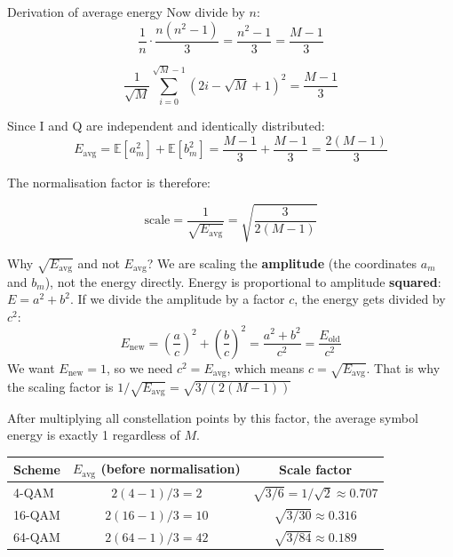 \begin{KeyBox}{Derivation of average energy}
Now divide by $n$:
\begin{equation}
\frac{1}{n} \cdot \frac{n(n^2 - 1)}{3} = \frac{n^2 - 1}{3} = \frac{M - 1}{3}
\end{equation}

\begin{equation}
\boxed{\frac{1}{\sqrt{M}}\sum_{i=0}^{\sqrt{M}-1}(2i - \sqrt{M} + 1)^2 = \frac{M-1}{3}}
\end{equation}

\vspace{0.5cm}

Since I and Q are independent and identically distributed:
\begin{equation}
E_{\text{avg}} = \mathbb{E}[a_m^2] + \mathbb{E}[b_m^2]
= \frac{M-1}{3} + \frac{M-1}{3}
= \frac{2(M-1)}{3}
\end{equation}
\end{KeyBox}

The normalisation factor is therefore:

\begin{equation}
\text{scale} = \frac{1}{\sqrt{E_{\text{avg}}}} = \sqrt{\frac{3}{2(M-1)}}
\end{equation}

\begin{IntuitionBox}{Why $\sqrt{E_{\text{avg}}}$ and not $E_{\text{avg}}$?}
We are scaling the \textbf{amplitude} (the coordinates $a_m$ and $b_m$), not the energy directly. Energy is proportional to amplitude \textbf{squared}: $E = a^2 + b^2$. If we divide the amplitude by a factor $c$, the energy gets divided by $c^2$:
\begin{equation}
E_{\text{new}} = \left(\frac{a}{c}\right)^2 + \left(\frac{b}{c}\right)^2 = \frac{a^2 + b^2}{c^2} = \frac{E_{\text{old}}}{c^2}
\end{equation}
We want $E_{\text{new}} = 1$, so we need $c^2 = E_{\text{avg}}$, which means $c = \sqrt{E_{\text{avg}}}$. That is why the scaling factor is $1/\sqrt{E_{\text{avg}}} = \sqrt{3/(2(M-1))}$
\end{IntuitionBox}

\vspace{1cm}

After multiplying all constellation points by this factor, the average symbol energy is exactly 1 regardless of $M$.

\begin{center}
\renewcommand{\arraystretch}{1.3}
\begin{tabular}{lcc}
\hline
\textbf{Scheme} & $E_{\text{avg}}$ (before normalisation) & \textbf{Scale factor} \\
\hline
4-QAM & $2(4-1)/3 = 2$ & $\sqrt{3/6} = 1/\sqrt{2} \approx 0.707$ \\
16-QAM & $2(16-1)/3 = 10$ & $\sqrt{3/30} \approx 0.316$ \\
64-QAM & $2(64-1)/3 = 42$ & $\sqrt{3/84} \approx 0.189$ \\
\hline
\end{tabular}
\end{center}

